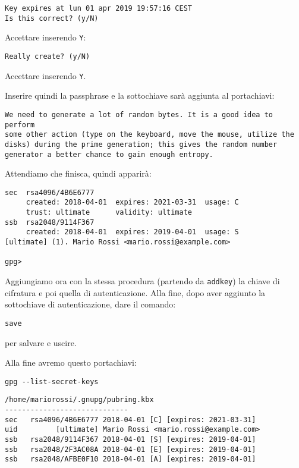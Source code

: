 \begin{lstlisting}
Key expires at lun 01 apr 2019 19:57:16 CEST
Is this correct? (y/N)
\end{lstlisting}

Accettare inserendo \texttt{Y}:

\begin{lstlisting}
Really create? (y/N)
\end{lstlisting}

Accettare inserendo \texttt{Y}.

Inserire quindi la passphrase e la sottochiave sarà aggiunta al portachiavi:

\begin{lstlisting}
We need to generate a lot of random bytes. It is a good idea to perform
some other action (type on the keyboard, move the mouse, utilize the
disks) during the prime generation; this gives the random number
generator a better chance to gain enough entropy.
\end{lstlisting}


Attendiamo che finisca, quindi apparirà:

\begin{lstlisting}
sec  rsa4096/4B6E6777
     created: 2018-04-01  expires: 2021-03-31  usage: C
     trust: ultimate      validity: ultimate
ssb  rsa2048/9114F367
     created: 2018-04-01  expires: 2019-04-01  usage: S
[ultimate] (1). Mario Rossi <mario.rossi@example.com>

gpg>
\end{lstlisting}


Aggiungiamo ora con la stessa procedura (partendo da \texttt{addkey}) la chiave
di cifratura e poi quella di autenticazione. Alla fine, dopo aver aggiunto la
sottochiave di autenticazione, dare il comando:

\begin{lstlisting}
save
\end{lstlisting}

\noindent per salvare e uscire.

Alla fine avremo questo portachiavi:

\begin{lstlisting}
gpg --list-secret-keys
\end{lstlisting}


\begin{lstlisting}
/home/mariorossi/.gnupg/pubring.kbx
-----------------------------
sec   rsa4096/4B6E6777 2018-04-01 [C] [expires: 2021-03-31]
uid         [ultimate] Mario Rossi <mario.rossi@example.com>
ssb   rsa2048/9114F367 2018-04-01 [S] [expires: 2019-04-01]
ssb   rsa2048/2F3AC08A 2018-04-01 [E] [expires: 2019-04-01]
ssb   rsa2048/AFBE0F10 2018-04-01 [A] [expires: 2019-04-01]
\end{lstlisting}

